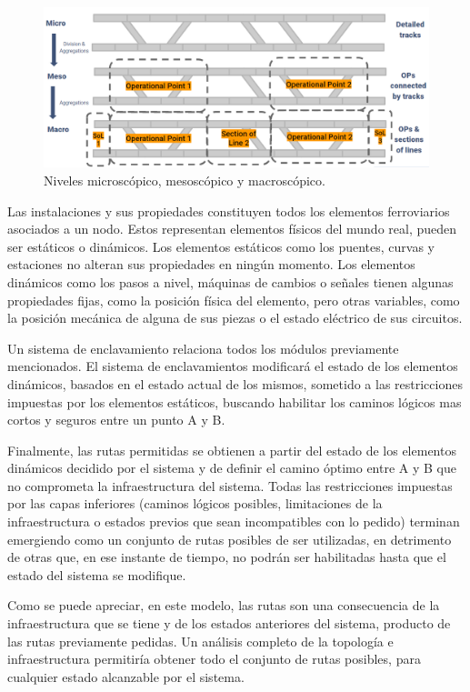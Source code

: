     \begin{figure}[!h]
        \centering
        \includegraphics[width=1\textwidth]{Figuras/railtopomodel}
        \centering\caption{Niveles microscópico, mesoscópico y macroscópico.}
        \label{fig:RTM_2}
    \end{figure}
    
    Las instalaciones y sus propiedades constituyen todos los elementos ferroviarios asociados a un nodo. Estos representan elementos físicos del mundo real, pueden ser estáticos o dinámicos. Los elementos estáticos como los puentes, curvas y estaciones no alteran sus propiedades en ningún momento. Los elementos dinámicos como los pasos a nivel, máquinas de cambios o señales tienen algunas propiedades fijas, como la posición física del elemento, pero otras variables, como la posición mecánica de alguna de sus piezas o el estado eléctrico de sus circuitos.

    Un sistema de enclavamiento relaciona todos los módulos previamente mencionados. El sistema de enclavamientos modificará el estado de los elementos dinámicos, basados en el estado actual de los mismos, sometido a las restricciones impuestas por los elementos estáticos, buscando habilitar los caminos lógicos mas cortos y seguros entre un punto A y B.

    Finalmente, las rutas permitidas se obtienen a partir del estado de los elementos dinámicos decidido por el sistema y de definir el camino óptimo entre A y B que no comprometa la infraestructura del sistema. Todas las restricciones impuestas por las capas inferiores (caminos lógicos posibles, limitaciones de la infraestructura o estados previos que sean incompatibles con lo pedido) terminan emergiendo como un conjunto de rutas posibles de ser utilizadas, en detrimento de otras que, en ese instante de tiempo, no podrán ser habilitadas hasta que el estado del sistema se modifique.

    Como se puede apreciar, en este modelo, las rutas son una consecuencia de la infraestructura que se tiene y de los estados anteriores del sistema, producto de las rutas previamente pedidas. Un análisis completo de la topología e infraestructura permitiría obtener todo el conjunto de rutas posibles, para cualquier estado alcanzable por el sistema.